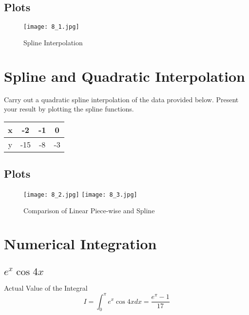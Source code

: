 \documentclass{article}
\begin{document}
\subsection{Plots}
\begin{figure}[!h]
\centering
\texttt{[image: 8\_1.jpg]}
\caption{Spline Interpolation}
\end{figure}
\newpage

\section{Spline and Quadratic Interpolation}
Carry out a quadratic spline interpolation of the data provided below. Present your result by plotting the spline functions.
\begin{table}[!h]
\begin{tabular}{|c|c|c|c|}\hline
x & -2    & -1    & 0    \\\hline
y & -15 & -8 & -3 \\ \hline
\end{tabular}
\end{table}
\subsection{Plots}
\begin{figure}[!h]
\centering
\texttt{[image: 8\_2.jpg]}
\texttt{[image: 8\_3.jpg]}
\caption{Comparison of Linear Piece-wise and Spline}
\end{figure}
\newpage

\section{Numerical Integration}
\subsection{$e^x\cos{4x}$}
Actual Value of the Integral
$$I = \int_{0}^{\pi} e^x\cos{4x} dx = \frac{e^{\pi}-1}{17}$$
\begin{table}[h!]
\end{table}
\end{document}
